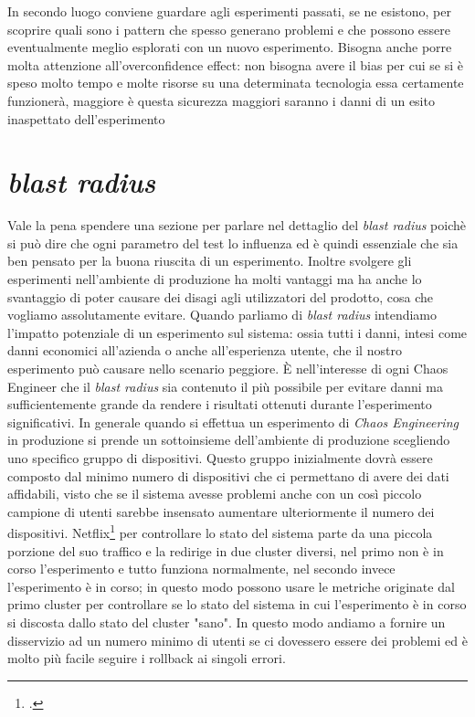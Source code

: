 In secondo luogo conviene guardare agli esperimenti passati, se ne esistono, per scoprire quali sono i pattern che spesso generano problemi e che possono essere eventualmente meglio esplorati con un nuovo esperimento.
Bisogna anche porre molta attenzione all'overconfidence effect: non bisogna avere il bias per cui se si è speso molto tempo e molte risorse su una determinata tecnologia essa certamente funzionerà, maggiore è questa sicurezza maggiori saranno i danni di un esito inaspettato dell'esperimento 
\section{\textit{blast radius}}
Vale la pena spendere una sezione per parlare nel dettaglio del \textit{blast radius} poichè si può dire che ogni parametro del test lo influenza ed è quindi essenziale che sia ben pensato per la buona riuscita di un esperimento.
Inoltre svolgere gli esperimenti nell'ambiente di produzione ha molti vantaggi ma ha anche lo svantaggio di poter causare dei disagi agli utilizzatori del prodotto, cosa che vogliamo assolutamente evitare.
Quando parliamo di \textit{blast radius} intendiamo l'impatto potenziale di un esperimento sul sistema: ossia tutti i danni, intesi come danni economici all'azienda o anche all'esperienza utente, che il nostro esperimento può causare nello scenario peggiore.
È nell'interesse di ogni Chaos Engineer che il \textit{blast radius} sia contenuto il più possibile per evitare danni ma sufficientemente grande da rendere i risultati ottenuti durante l'esperimento significativi.     
In generale quando si effettua un esperimento di \textit{Chaos Engineering} in produzione si prende un sottoinsieme dell'ambiente di produzione scegliendo uno specifico gruppo di dispositivi.
Questo gruppo inizialmente dovrà essere composto dal minimo numero di dispositivi che ci permettano di avere dei dati affidabili, visto che se il sistema avesse problemi anche con un così piccolo campione di utenti sarebbe insensato aumentare ulteriormente il numero dei dispositivi.
Netflix\footcite[]{site:netlifx-chaos-talk-nora} per controllare lo stato del sistema parte da una piccola porzione del suo traffico e la redirige in due cluster diversi, nel primo non è in corso l'esperimento e tutto funziona normalmente, nel secondo invece l'esperimento è in corso; in questo modo possono usare le metriche originate dal primo cluster per controllare se lo stato del sistema in cui l'esperimento è in corso si discosta dallo stato del cluster "sano".
In questo modo andiamo a fornire un disservizio ad un numero minimo di utenti se ci dovessero essere dei problemi ed è molto più facile seguire i rollback ai singoli errori.
